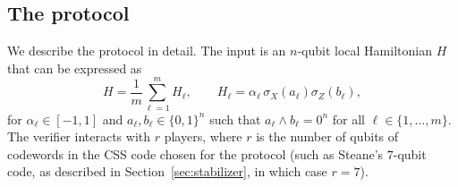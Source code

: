 \documentclass[11pt,letterpaper]{article}
\newcommand{\<}{\langle}
\renewcommand{\>}{\rangle}
\begin{document}
\subsection{The protocol} 

We describe the protocol in detail. The input is an $n$-qubit
local Hamiltonian $H$ that can be expressed as
\begin{equation}\label{eq:h-form}
H = \frac{1}{m}\sum_{\ell=1}^m H_\ell, \qquad H_\ell = \alpha_\ell \,\sigma_X(a_\ell)\sigma_Z(b_\ell),
\end{equation}
for $\alpha_\ell \in [-1,1]$ and  $a_\ell,b_\ell\in\{0,1\}^n$ such that $a_\ell\wedge b_\ell=0^n$ for all $\ell\in\{1,\ldots,m\}$. 
 The verifier interacts with $r$
players, where $r$ is the number of qubits of codewords in the CSS code chosen for the protocol (such as Steane's $7$-qubit code, as described in Section~\ref{sec:stabilizer},  in which case $r=7$).
\end{document}
